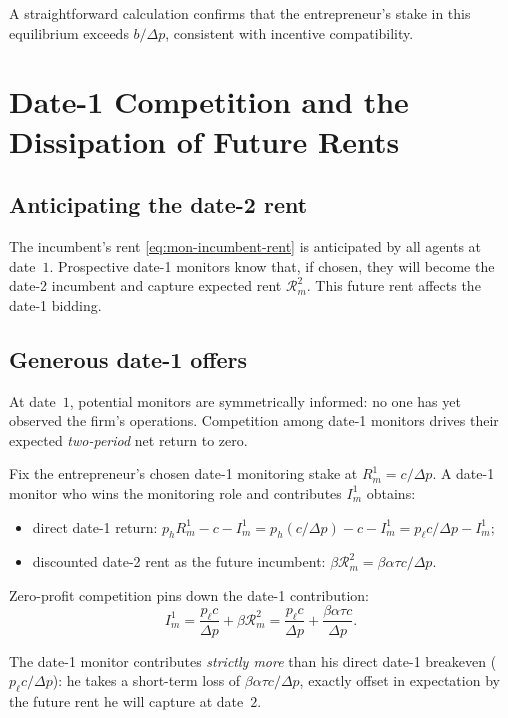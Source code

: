 \documentclass[11pt,a4paper,oneside]{book}
\theoremstyle{plain}
\theoremstyle{definition}
\theoremstyle{remark}
\numberwithin{equation}{chapter}
\begin{document}
A straightforward calculation confirms that the entrepreneur's stake in this equilibrium exceeds $b/\Delta p$, consistent with incentive compatibility.

\section{Date-1 Competition and the Dissipation of Future Rents}
\label{sec:mon-date1}

\subsection{Anticipating the date-2 rent}

The incumbent's rent \eqref{eq:mon-incumbent-rent} is anticipated by all agents at date~$1$.
Prospective date-1 monitors know that, if chosen, they will become the date-2 incumbent and capture expected rent $\mathcal{R}_m^2$.
This future rent affects the date-1 bidding.

\subsection{Generous date-1 offers}

At date~$1$, potential monitors are symmetrically informed: no one has yet observed the firm's operations.
Competition among date-1 monitors drives their expected \emph{two-period} net return to zero.

Fix the entrepreneur's chosen date-1 monitoring stake at $R_m^1 = c/\Delta p$.
A date-1 monitor who wins the monitoring role and contributes $I_m^1$ obtains:
\begin{itemize}
  \item direct date-1 return: $p_h R_m^1 - c - I_m^1 = p_h (c/\Delta p) - c - I_m^1 = p_\ell c/\Delta p - I_m^1$;
  \item discounted date-2 rent as the future incumbent: $\beta \mathcal{R}_m^2 = \beta \alpha \tau c/\Delta p$.
\end{itemize}
Zero-profit competition pins down the date-1 contribution:
\begin{equation}\label{eq:mon-date1-bid}
  I_m^1 = \frac{p_\ell c}{\Delta p} + \beta \mathcal{R}_m^2 = \frac{p_\ell c}{\Delta p} + \frac{\beta \alpha \tau c}{\Delta p}.
\end{equation}

The date-1 monitor contributes \emph{strictly more} than his direct date-1 breakeven ($p_\ell c/\Delta p$): he takes a short-term loss of $\beta \alpha \tau c/\Delta p$, exactly offset in expectation by the future rent he will capture at date~$2$.
\end{document}
